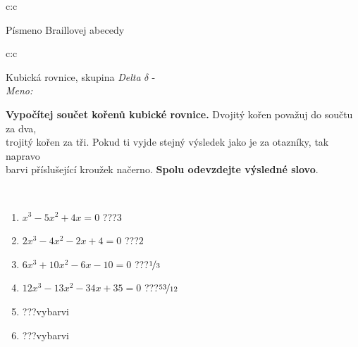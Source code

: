 \documentclass[10pt]{report}
\begin{document}
\begin{tabular}{c:c}
\begin{minipage}[c][104.5mm][t]{0.5\linewidth}
\begin{center}
\begin{minipage}{0.20\linewidth}
\begin{center}
{\small Písmeno Braillovej abecedy}
\end{center}
\end{minipage}
\end{center}
\end{minipage}
%
\end{tabular}
\newpage
\thispagestyle{empty}
\begin{tabular}{c:c}
\begin{minipage}[c][104.5mm][t]{0.5\linewidth}
\begin{center}
\vspace{7mm}
{\huge Kubická rovnice, skupina \textit{Delta $\delta$} -}\\[5mm]
\textit{Meno:}\phantom{xxxxxxxxxxxxxxxxxxxxxxxxxxxxxxxxxxxxxxxxxxxxxxxxxxxxxxxxxxxxxxxxx}\\[5mm]
\begin{minipage}{0.95\linewidth}
\textbf{Vypočítej součet kořenů kubické rovnice.} Dvojitý kořen považuj do součtu za dva,\\trojitý kořen za tři. Pokud ti vyjde stejný výsledek jako je za otazníky, tak napravo\\barvi příslušející kroužek načerno. \textbf{Spolu odevzdejte výsledné slovo}.
\end{minipage}
\\[1mm]
\begin{minipage}{0.79\linewidth}
\begin{center}
\begin{varwidth}{\linewidth}
\begin{enumerate}
\Large
\item $x^3-5x^2+4x=0$\quad \dotfill\; ???\;\dotfill \quad $3$
\item $2x^3-4x^2-2x+4=0$\quad \dotfill\; ???\;\dotfill \quad $2$
\item $6x^3+10x^2-6x-10=0$\quad \dotfill\; ???\;\dotfill \quad $\nicefrac{1}{3}$
\item $12x^3-13x^2-34x+35=0$\quad \dotfill\; ???\;\dotfill \quad $\nicefrac{53}{12}$
\item \quad \dotfill\; ???\;\dotfill \quad vybarvi
\item \quad \dotfill\; ???\;\dotfill \quad vybarvi
\end{enumerate}
\end{varwidth}
\end{center}
\end{minipage}
\begin{minipage}{0.20\linewidth}
\begin{center}

\end{center}
\end{minipage}
\end{center}
\end{minipage}
\end{tabular}
\end{document}
